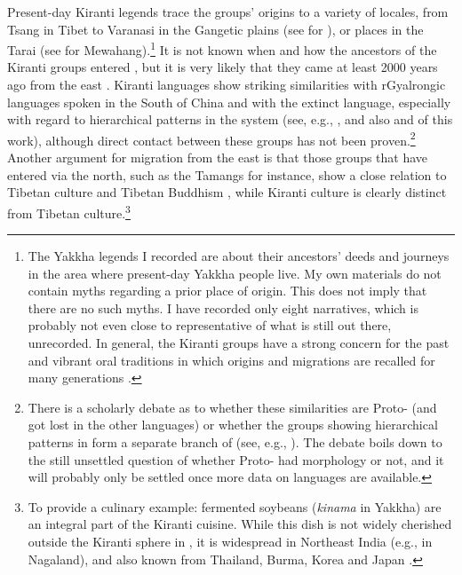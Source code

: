 Present-day Kiranti legends trace the groups' origins to a variety of locales, from Tsang in Tibet to Varanasi in the Gangetic plains (see \citealt[xix]{Driem1987A-grammar} for ), or places in the Tarai (see \citealt[34]{Gaenszle2012_Where} for Mewahang).\footnote{The Yakkha legends I recorded are about their ancestors' deeds and journeys in the area where present-day Yakkha people live. My own materials do not contain myths regarding a prior place of origin. This does not imply that there are no such myths. I have recorded only eight narratives, which is probably not even close to representative of what is still out there, unrecorded. In general, the Kiranti groups have a strong concern for the past and vibrant oral traditions in which origins and migrations are recalled for many generations \citep{Gaenszle2000Origins, Gaenszle2002_Remaking}.} It is not known when and how the ancestors of the Kiranti groups entered , but it is very likely that they came at least 2000 years ago from the east \citep{Driem2001Languages, LaPolla2001_Role, Gaenszle2002_Remaking}. Kiranti languages show striking similarities with rGyalrongic languages spoken in the South of China and with the extinct  language, especially with regard to hierarchical patterns in the  system (see, e.g., \citet{DeLancey1981_Category, Ebert1990Evidence, LaPolla2007Hierarchical, Jacques2012_Agreement}, and also  and  of this work), although direct contact between these  groups has not been proven.\footnote{There is a scholarly debate as to whether these similarities are Proto- (and got lost in the other languages) or whether the groups showing hierarchical patterns in  form a separate branch of  (see, e.g., \citealt{Driem1991Tangut, LaPolla2001_Role, DeLancey2010_Towards, Jacques2012_Agreement, LaPolla2012_Comments}). The debate boils down to the still unsettled question of whether Proto- had  morphology or not, and it will probably only be settled once more data on  languages are available.} Another argument for  migration from the east is that those  groups that have entered  via the north, such as the Tamangs for instance, show a close relation to Tibetan culture and Tibetan Buddhism \citep{LaPolla2001_Role}, while Kiranti culture is clearly distinct from Tibetan culture.\footnote{To provide a culinary example: fermented soybeans (\emph{kinama} in Yakkha) are an integral part of the Kiranti cuisine. While this dish is not widely cherished outside the Kiranti sphere in , it is widespread in Northeast India (e.g., in Nagaland), and  also known from Thailand, Burma, Korea and Japan \citep{Tamang2010_fermented}.} 
 
